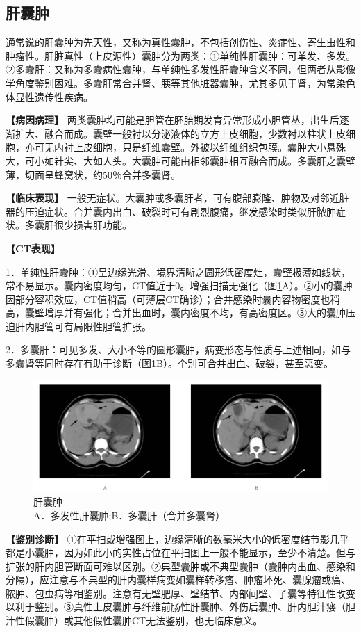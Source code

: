 \subsection{肝囊肿}

通常说的肝囊肿为先天性，又称为真性囊肿，不包括创伤性、炎症性、寄生虫性和肿瘤性。肝脏真性（上皮源性）囊肿分为两类：①单纯性肝囊肿：可单发、多发。②多囊肝：又称为多囊病性囊肿，与单纯性多发性肝囊肿含义不同，但两者从影像学角度鉴别困难。多囊肝常合并肾、胰等其他脏器囊肿，尤其多见于肾，为常染色体显性遗传性疾病。

\textbf{【病因病理】}
两类囊肿均可能是胆管在胚胎期发育异常形成小胆管丛，出生后逐渐扩大、融合而成。囊壁一般衬以分泌液体的立方上皮细胞，少数衬以柱状上皮细胞，亦可无内衬上皮细胞，只是纤维囊壁。外被以纤维组织包膜。囊肿大小悬殊大，可小如针尖、大如人头。大囊肿可能由相邻囊肿相互融合而成。多囊肝之囊壁薄，切面呈蜂窝状，约50％合并多囊肾。

\textbf{【临床表现】}
一般无症状。大囊肿或多囊肝者，可有腹部膨隆、肿物及对邻近脏器的压迫症状。合并囊内出血、破裂时可有剧烈腹痛，继发感染时类似肝脓肿症状。多囊肝很少损害肝功能。

\textbf{【CT表现】}

1．单纯性肝囊肿：①呈边缘光滑、境界清晰之圆形低密度灶，囊壁极薄如线状，常不易显示。囊内密度均匀，CT值近于0。增强扫描无强化（图\ref{fig11-10}A）。②小的囊肿因部分容积效应，CT值稍高（可薄层CT确诊）；合并感染时囊内容物密度也稍高，囊壁增厚并有强化；合并出血时，囊内密度不均，有高密度区。③大的囊肿压迫肝内胆管可有局限性胆管扩张。

2．多囊肝：可见多发、大小不等的圆形囊肿，病变形态与性质与上述相同，如与多囊肾等同时存在有助于诊断（图\ref{fig11-10}B）。个别可合并出血、破裂，甚至恶变。

\begin{figure}[!htbp]
 \centering
 \includegraphics[width=.7\textwidth,height=\textheight,keepaspectratio]{./images/Image00282.jpg}
 \captionsetup{justification=centering}
 \caption{肝囊肿\\{\small A．多发性肝囊肿;B．多囊肝（合并多囊肾）}}
 \label{fig11-10}
  \end{figure} 

\textbf{【鉴别诊断】}
①在平扫或增强图上，边缘清晰的数毫米大小的低密度结节影几乎都是小囊肿，因为如此小的实性占位在平扫图上一般不能显示，至少不清楚。但与扩张的肝内胆管断面可难以区别。②典型囊肿或不典型囊肿（囊肿内出血、感染和分隔），应注意与不典型的肝内囊样病变如囊样转移瘤、肿瘤坏死、囊腺瘤或癌、脓肿、包虫病等相鉴别。注意有无壁肥厚、壁结节、内部间壁、子囊等特征性改变以利于鉴别。③真性上皮囊肿与纤维前肠性肝囊肿、外伤后囊肿、肝内胆汁瘘（胆汁性假囊肿）或其他假性囊肿CT无法鉴别，也无临床意义。

